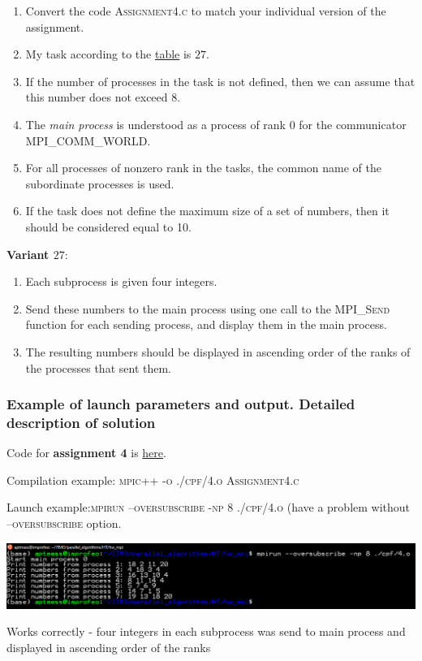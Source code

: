 \documentclass[%
12pt, %
final, %
oneside, %
onecolumn, %
centertags]{article} %
\theoremstyle{plain}
\theoremstyle{definition}
\theoremstyle{remark}
\begin{document}
\begin{enumerate}
	\item Convert the code \textsc{Assignment4.c} to match your individual version of the assignment.
	\item My task according to the \href{https://docs.google.com/spreadsheets/d/1m2KqmSc5pMMQ9JezZGybnuKG75FywUcs8gbPuMvVUxc/edit#gid=1272007391}{table} is $27$.
	\item If the number of processes in the task is not defined, then we can assume that this number does not exceed 8. \item The \textit{main process} is understood as a process of rank $0$ for the communicator \textsc{MPI\_COMM\_WORLD}. \item For all processes of nonzero rank in the tasks, the common name of the subordinate processes is used. 
	\item If the task does not define the maximum size of a set of numbers, then it should be considered equal to 10.
\end{enumerate}

\textbf{Variant $27$}:

\begin{enumerate}
	\item Each subprocess is given four integers. 
	\item Send these numbers to the main process using one call to the \textsc{MPI\_Send} function for each sending process, and display them in the main process. 
	\item The resulting numbers should be displayed in ascending order of the ranks of the processes that sent them.
\end{enumerate}


\subsubsection{Example of launch parameters and output. Detailed description of solution}

Code for \textbf{assignment 4} is \href{https:\//github.com/aptmess/parallel_algorithms/blob/master/HT/hw_mpi/Assignment4.c}{here}.

Compilation example: \textsc{mpic++ -o ./cpf/4.o Assignment4.c}

Launch example:\textsc{mpirun --oversubscribe -np 8 ./cpf/4.o} (have a problem without \textsc{--oversubscribe} option.

\begin{center}
\includegraphics[scale=0.55]{4.1.png}

Works correctly - four integers in each subprocess was send to main process and displayed in ascending order of the ranks
\end{center}
\end{document}
